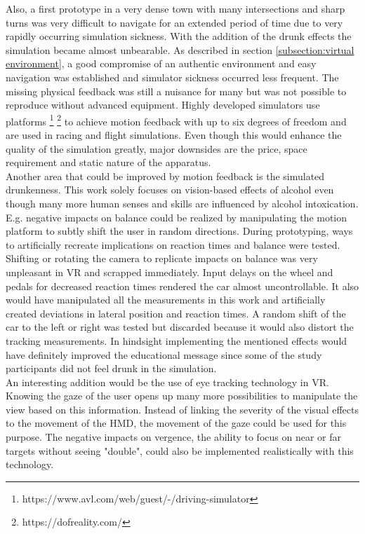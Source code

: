 Also, a first prototype in a very dense town with many intersections and sharp turns was very difficult to navigate for an extended period of time due to very rapidly occurring simulation sickness.
With the addition of the drunk effects the simulation became almost unbearable. 
As described in section \ref{subsection:virtual environment}, a good compromise of an authentic environment and easy navigation was established and simulator sickness occurred less frequent. 
The missing physical feedback was still a nuisance for many but was not possible to reproduce without advanced equipment.
Highly developed simulators use platforms \footnote{https://www.avl.com/web/guest/-/driving-simulator} \footnote{https://dofreality.com/} to achieve motion feedback with up to six degrees of freedom and are used in racing and flight simulations.
Even though this would enhance the quality of the simulation greatly, major downsides are the price, space requirement and static nature of the apparatus. 
\\
Another area that could be improved by motion feedback is the simulated drunkenness.
This work solely focuses on vision-based effects of alcohol even though many more human senses and skills are influenced by alcohol intoxication. 
E.g. negative impacts on balance could be realized by manipulating the motion platform to subtly shift the user in random directions.
During prototyping, ways to artificially recreate implications on reaction times and balance were tested.
Shifting or rotating the camera to replicate impacts on balance was very unpleasant in VR and scrapped immediately.
Input delays on the wheel and pedals for decreased reaction times rendered the car almost uncontrollable.
It also would have manipulated all the measurements in this work and artificially created deviations in lateral position and reaction times. 
A random shift of the car to the left or right was tested but discarded because it would also distort the tracking measurements.
In hindsight implementing the mentioned effects would have definitely improved the educational message since some of the study participants did not feel drunk in the simulation.
\\
An interesting addition would be the use of eye tracking technology in VR. \autocite[]{Clay_König_König_2019}
Knowing the gaze of the user opens up many more possibilities to manipulate the view based on this information. 
Instead of linking the severity of the visual effects to the movement of the HMD, the movement of the gaze could be used for this purpose.
The negative impacts on vergence, the ability to focus on near or far targets without seeing "double", could also be implemented realistically with this technology.
